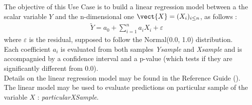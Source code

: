 \renewcommand{\filename}{docUC_InputWithData_LinearModel.tex}
\renewcommand{\filetitle}{UC : Estimation and validation of a linear model from two samples}

\HeaderIIILevel






The objective of this Use Case is to build a linear regression model between a the scalar variable $Y$ and the n-dimensional one $\vect{X} = (X_i)_{i \leq n}$, as follows :
\begin{align*}
  \tilde{Y} = a_0 + \sum_{i=1}^n a_i X_i + \varepsilon
\end{align*}
where $\varepsilon$ is the residual, supposed to follow the Normal(0.0, 1.0) distribution.\\
Each coefficient $a_i$ is evaluated from both samples {\itshape Ysample} and {\itshape Xsample} and is accompagnied by a confidence interval and a p-value (which tests if they are significantly different from 0.0).\\




Details on the linear regression model  may be found in the Reference Guide ().\\



The linear model may be used to evaluate predictions on particular sample of the variable $X$ :  {\itshape particularXSample}.\\

